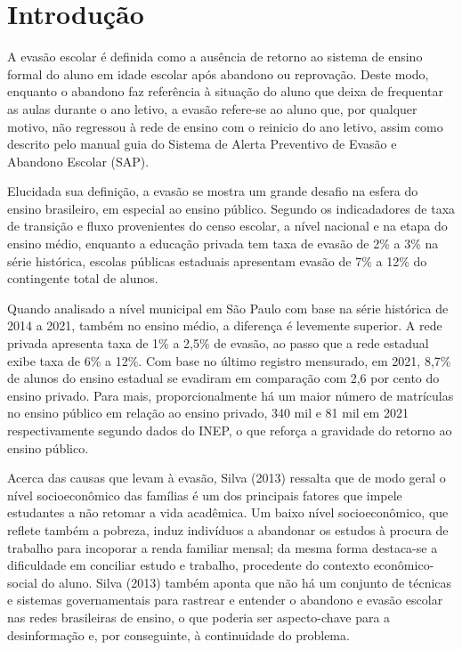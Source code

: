 \documentclass[english, spanish, brazilian]{RBIEarticle} %
\begin{document}
\pagebreak


\section{Introdução}
A evasão escolar é definida como a ausência de retorno ao sistema de ensino formal do aluno em idade escolar após abandono ou reprovação. Deste modo, enquanto o abandono faz referência à situação do aluno que deixa de frequentar as aulas durante o ano letivo, a evasão refere-se ao aluno que, por qualquer motivo, não regressou à rede de ensino com o reinicio do ano letivo, assim como descrito pelo manual guia do Sistema de Alerta Preventivo  de Evasão e Abandono Escolar (SAP). 

Elucidada sua definição, a evasão se mostra um grande desafio na esfera do ensino brasileiro, em especial ao ensino público. Segundo os indicadadores de taxa de transição e fluxo provenientes do censo escolar, a nível nacional e na etapa do ensino médio, enquanto a educação privada tem taxa de evasão de 2\% a 3\% na série histórica, escolas públicas estaduais apresentam evasão de 7\% a 12\% do contingente total de alunos. 

Quando analisado a nível municipal em São Paulo com base na série histórica de 2014 a 2021, também no ensino médio, a diferença é levemente superior. A rede privada apresenta taxa de 1\% a 2,5\% de evasão, ao passo que a rede estadual exibe taxa de 6\% a 12\%. Com base no último registro mensurado, em 2021, 8,7\% de alunos do ensino estadual se evadiram em comparação com 2,6 por cento do ensino privado. Para mais, proporcionalmente há um maior número de matrículas no ensino público em relação ao ensino privado, 340 mil e 81 mil em 2021 respectivamente segundo dados do INEP, o que reforça a gravidade do retorno ao ensino público. 

Acerca das causas que levam à evasão, Silva (2013) ressalta que de modo geral o nível socioeconômico das famílias é um dos principais fatores que impele estudantes a não retomar a vida acadêmica. Um baixo nível socioeconômico, que reflete também a pobreza, induz indivíduos a abandonar os estudos à procura de trabalho para incoporar a renda familiar mensal; da mesma forma destaca-se a dificuldade em conciliar estudo e trabalho, procedente do contexto econômico-social do aluno. Silva (2013) também aponta que não há um conjunto de técnicas e sistemas governamentais para rastrear e entender o abandono e evasão escolar nas redes brasileiras de ensino, o que poderia ser aspecto-chave para a desinformação e, por conseguinte, à continuidade do problema.
\end{document}
